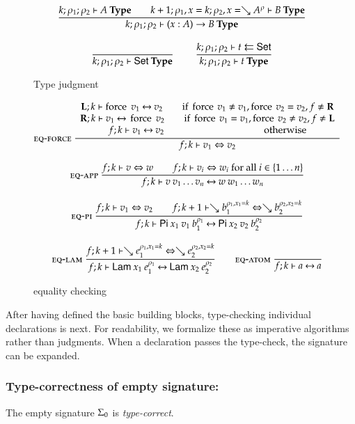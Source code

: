 \begin{figure}[htp]
\begin{gather*}
\ \dfrac{k;\rho_1;\rho_2\vdash A\:\mathbf{Type}
\qquad
k+1;\rho_1,x=k;\rho_2,x=\searrow A^{\rho}\vdash B\:\mathbf{Type}}{k;\rho_1;\rho_2\vdash( x : A ) \rightarrow{B}\:\mathbf{Type}}
\\[2ex]
\ \dfrac{}{k;\rho_1;\rho_2\vdash\mathsf{Set}\:\mathbf{Type}}
\qquad
\ \dfrac{k;\rho_1;\rho_2\vdash t\leftleftarrows\mathsf{Set}}{k;\rho_1;\rho_2\vdash t\:\mathbf{Type}}
\end{gather*}
\caption{Type judgment}
\label{ftype}
\end{figure}

\begin{figure}[htp]
\begin{gather*}
\mbox{\sc eq-force}\ \dfrac{\begin{array}[b]{c}\mathbf{L};k\vdash\operatorname{force} \; v_1{\:\leftrightarrow\:}v_2 \qquad \mbox{if } \operatorname{force} \: v_1 \neq v_1 , \operatorname{force} \: v_2 = v_2  , f \neq \mathbf{R}
\\\mathbf{R};k\vdash v_1{\:\leftrightarrow\:}\operatorname{force} \; v_2 \qquad \mbox{if } \operatorname{force} \: v_1 = v_1 , \operatorname{force} \: v_2 \neq v_2 , f \neq \mathbf{L} \\f;k\vdash v_1{\:\leftrightarrow\:}v_2 \qquad \qquad \qquad \qquad \qquad \mbox{ otherwise}\end{array}}{f;k\vdash v_1\Leftrightarrow v_2}
\\[2ex]
\mbox{\sc eq-app}\ \dfrac{f;k\vdash v\Leftrightarrow w \qquad
f;k\vdash v_i\Leftrightarrow w_i \mbox{ for all } i \in \{ 1 \ldots n\}}{f;k\vdash v \: v_1 \ldots v_n{\:\leftrightarrow\:}w \: w_1 \ldots w_n}
\\[2ex]
\mbox{\sc eq-pi}\ \dfrac{f;k\vdash v_1\Leftrightarrow v_2
\qquad
f;k+1\vdash\searrow b_1^{\rho_1,x_1=k}\Leftrightarrow\searrow b_2^{\rho_2,x_2=k}}{f;k\vdash\mathsf{Pi} \: x_1 \: v_1 \: b_1^{\rho_1}{\:\leftrightarrow\:}\mathsf{Pi} \: x_2 \: v_2 \: b_2^{\rho_2}}
\\[2ex]
\mbox{\sc eq-lam}\ \dfrac{f;k+1\vdash\searrow e_1^{\rho_1,x_1=k}\Leftrightarrow\searrow e_2^{\rho_2,x_2=k}}{f;k\vdash\mathsf{Lam} \: x_1 \: e_1^{\rho_1}{\:\leftrightarrow\:}\mathsf{Lam} \: x_2 \: e_2^{\rho_2}}
\qquad
\mbox{\sc eq-atom}\ \dfrac{}{f;k\vdash a{\:\leftrightarrow\:}a}
\end{gather*}
\caption{equality checking}
\label{feq}
\end{figure}

After having defined the basic building blocks, type-checking individual declarations is next.
For readability, we formalize these as imperative algorithms rather than judgments. 
When a declaration passes the type-check, the signature can be expanded. 
\subsubsection{Type-correctness of empty signature:}
The empty signature $\Sigma_0$ is \emph{type-correct}.

